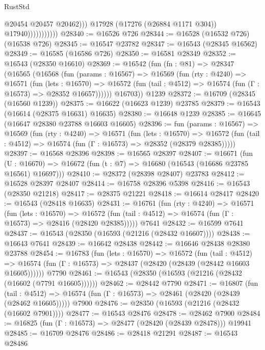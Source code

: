 \begin{lexlean}{RustStd}
\begin{coremodule}
                                @20454
                                @20457
                                @20462)))
                          @17928
                          (@17276 (@26884 @1171 @304))
                          @17940)))))))))))
@28340 := @16526 @726
@28344 := @16528 (@16532 @726) (@16538 @726)
@28345 := @16547 @23782
@28347 := @16543 (@28345 @16562)
@28349 := @16585 (@16586 @726)
@28350 := @16581 @28349
@28352 := @16543 (@28350 @16610)
@28369 := @16542
    (fun (fn : @81) =>
    @28347
      (@16565
        (@16568
          (fun (params : @16567) =>
          @16569
            (fun (rty : @4240) =>
            @16571
              (fun (lets : @16570) =>
              @16572 (fun (tail : @4512) => @16574 (fun (Γ : @16573) => @28352 @16657))))))
        @16703))
    @1239
@28372 := @16709 (@28345 (@16560 @1239))
@28375 := @16622 (@16623 @1239) @23785
@28379 := @16543 (@16614 (@28375 @16631) @16635)
@28380 := @16648 @1239
@28385 := @16645 (@16647 @28380 @23788 @16603 @16605)
@28396 := fun (params : @16567) =>
  @16569
    (fun (rty : @4240) =>
    @16571
      (fun (lets : @16570) =>
      @16572 (fun (tail : @4512) => @16574 (fun (Γ : @16573) => @28352 (@28379 @28385)))))
@28397 := @16568 @28396
@28398 := @16565 @28397
@28407 := @16671
    (fun (U : @16670) => @16672 (fun (t : @7) => @16680 (@16543 (@16686 @23785 @16561) @16697)))
@28410 := @28372 (@28398 @28407) @23783
@28412 := @16528 @28397 @28407
@28414 := @16758 @28396 @5398
@28416 := @16543 (@28350 @21218)
@28417 := @28375 @21221
@28418 := @16614 @28417
@28420 := @16543 (@28418 @16635)
@28431 := @16761
    (fun (rty : @4240) =>
    @16571
      (fun (lets : @16570) =>
      @16572 (fun (tail : @4512) => @16574 (fun (Γ : @16573) => @28416 (@28420 @28385)))))
    @7641
@28432 := @16599 @7641
@28437 := @16543 (@28350 (@16593 (@21216 (@28432 @16607))))
@28438 := @16643 @7641
@28439 := @16642 @28438
@28442 := @16646 @28438 @28380 @23788
@28454 := @16783
    (fun (lets : @16570) =>
    @16572
      (fun (tail : @4512) =>
      @16574 (fun (Γ : @16573) => @28437 (@28420 (@28439 (@28442 @16603 @16605))))))
    @7790
@28461 := @16543 (@28350 (@16593 (@21216 (@28432 (@16602 (@7791 @16605))))))
@28462 := @28442 @7790
@28471 := @16807
    (fun (tail : @4512) => @16574 (fun (Γ : @16573) => @28461 (@28420 (@28439 (@28462 @16605)))))
    @7900
@28476 := @28350 (@16593 (@21216 (@28432 (@16602 @7901))))
@28477 := @16543 @28476
@28478 := @28462 @7900
@28484 := @16825 (fun (Γ : @16573) => @28477 (@28420 (@28439 @28478))) @19941
@28485 := @16709 @28476
@28486 := @28418 @21291
@28487 := @16543 @28486

\end{coremodule}
\end{lexlean}
